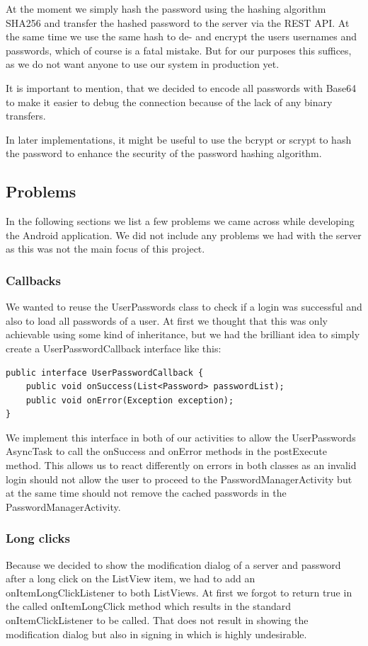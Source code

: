 \documentclass{report}
\begin{document}
At the moment we simply hash the password using the hashing algorithm SHA256 and transfer the hashed password to the server via the REST API. At the same time we use the same hash to de- and encrypt the users usernames and passwords, which of course is a fatal mistake. But for our purposes this suffices, as we do not want anyone to use our system in production yet.

It is important to mention, that we decided to encode all passwords with Base64 to make it easier to debug the connection because of the lack of any binary transfers.

In later implementations, it might be useful to use the bcrypt or scrypt to hash the password to enhance the security of the password hashing algorithm.

\subsection{Problems}
In the following sections we list a few problems we came across while developing the Android application. We did not include any problems we had with the server as this was not the main focus of this project.

\subsubsection{Callbacks}
We wanted to reuse the UserPasswords class to check if a login was successful and also to load all passwords of a user. At first we thought that this was only achievable using some kind of inheritance, but we had the brilliant idea to simply create a UserPasswordCallback interface like this:
\begin{lstlisting}
public interface UserPasswordCallback {
    public void onSuccess(List<Password> passwordList);
    public void onError(Exception exception);
}
\end{lstlisting}

We implement this interface in both of our activities to allow the UserPasswords AsyncTask to call the onSuccess and onError methods in the postExecute method. This allows us to react differently on errors in both classes as an invalid login should not allow the user to proceed to the PasswordManagerActivity but at the same time should not remove the cached passwords in the PasswordManagerActivity.

\subsubsection{Long clicks}
Because we decided to show the modification dialog of a server and password after a long click on the ListView item, we had to add an onItemLongClickListener to both ListViews. At first we forgot to return true in the called onItemLongClick method which results in the standard onItemClickListener to be called. That does not result in showing the modification dialog but also in signing in which is highly undesirable.
\end{document}
